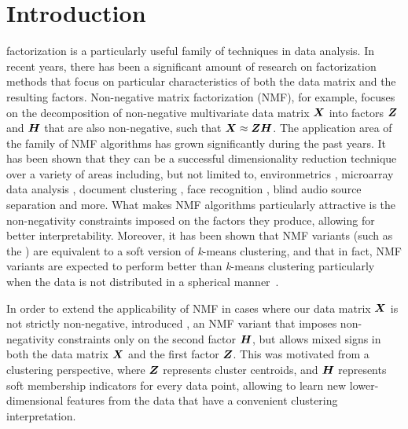 \documentclass[10pt,journal,compsoc]{IEEEtran}
\begin{document}
\section{Introduction}
 factorization is a particularly useful family of techniques in data analysis. In recent years, there has been a significant amount of research on factorization methods that focus on particular characteristics of both the data matrix and the resulting factors. Non-negative matrix factorization (NMF), for example, focuses on the decomposition of non-negative multivariate data matrix $\boldsymbol X$ into factors $\boldsymbol Z$ and $\boldsymbol H$ that are also non-negative, such that $\boldsymbol X \approx \boldsymbol Z \boldsymbol H$. The application area of the family of NMF algorithms has grown significantly during the past years. It has been shown that they can be a successful dimensionality reduction technique over a variety of areas including, but not limited to, environmetrics \cite{paatero1994positive}, microarray  data analysis \cite{brunet2004metagenes,devarajan2008nonnegative}, document clustering \cite{berry2005email}, face recognition \cite{zafeiriou2006exploiting,kotsia2007novel}, blind audio source separation \cite{weninger2012optimization} and more. What makes NMF algorithms particularly attractive is the non-negativity constraints imposed on the factors they produce, allowing for better interpretability. Moreover, it has been shown that NMF variants (such as the \seminmf) are equivalent to a soft version of \emph{k}-means clustering, and that in fact, NMF variants are expected to perform better than \emph{k}-means clustering particularly when the data is not distributed in a spherical manner~\cite{ding2010convex,ding2005equivalency}. 

In order to extend the applicability of NMF in cases where our data matrix $\boldsymbol X$ is not strictly non-negative, \cite{ding2010convex} introduced \seminmf, an NMF variant that imposes non-negativity constraints only on the second factor $\boldsymbol H$, but allows mixed signs in both the data matrix $\boldsymbol X$ and the first factor $\boldsymbol Z$. This was motivated from a clustering perspective, where $\boldsymbol Z$ represents cluster centroids, and $\boldsymbol H$ represents soft membership indicators for every data point, allowing \seminmf to learn new lower-dimensional features from the data that have a convenient clustering interpretation.
\end{document}
